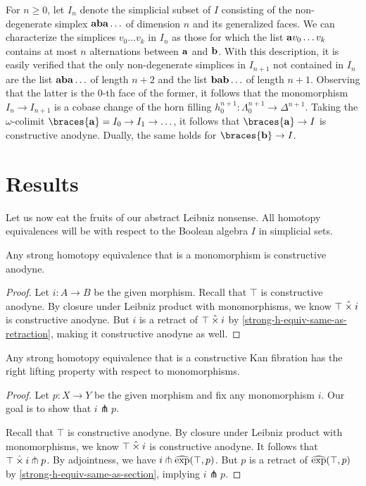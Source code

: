 \documentclass[reqno,10pt,a4paper,oneside]{amsart}
\begin{document}
For $n \geq 0$, let $I_n$ denote the simplicial subset of $I$ consisting of the non-degenerate simplex $\mathbf{a} \mathbf{b} \mathbf{a} \ldots$ of dimension $n$ and its generalized faces.
We can characterize the simplices $v_0 \ldots v_k$ in $I_n$ as those for which the list $\mathbf{a} v_0 \ldots v_k$ contains at most $n$ alternations between $\mathbf{a}$ and $\mathbf{b}$.
With this description, it is easily verified that the only non-degenerate simplices in $I_{n+1}$ not contained in $I_n$ are the list $\mathbf{a} \mathbf{b} \mathbf{a} \ldots$ of length $n+2$ and the list $\mathbf{b} \mathbf{a} \mathbf{b} \ldots$ of length $n+1$.
Observing that the latter is the $0$-th face of the former, it follows that the monomorphism $I_n \to I_{n+1}$ is a cobase change of the horn filling $h_{0}^{n+1} : \Lambda_0^{n+1} \to \Delta^{n+1}$.
Taking the $\omega$-colimit $\braces{\ptA} = I_0 \to I_1 \to \ldots$, it follows that $\braces{\ptA} \to I$ is constructive anodyne.
Dually, the same holds for $\braces{\ptB} \to I$.

\section{Results}

Let us now eat the fruits of our abstract Leibniz nonsense.
All homotopy equivalences will be with respect to the Boolean algebra $I$ in simplicial sets.

\begin{lemma}
\label{strong-h-equiv-mono-is-anodyne}
Any strong homotopy equivalence that is a monomorphism is constructive anodyne.
\end{lemma}

\begin{proof}
Let $i : A \to B$ be the given morphism.
Recall that $\top$ is constructive anodyne.
By closure under Leibniz product with monomorphisms, we know $\top \mathbin{\hat{\times}} i$ is constructive anodyne.
But $i$ is a retract of $\top \mathbin{\hat{\times}} i$ by \cref{strong-h-equiv-same-as-retraction}, making it constructive anodyne as well.
\end{proof}

\begin{lemma}
Any strong homotopy equivalence that is a constructive Kan fibration has the right lifting property with respect to monomorphisms.
\end{lemma}

\begin{proof}
Let $p : X \to Y$ be the given morphism and fix any monomorphism $i$.
Our goal is to show that $i \pitchfork p$.

Recall that $\top$ is constructive anodyne.
By closure under Leibniz product with monomorphisms, we know $\top \mathbin{\hat{\times}} i$ is constructive anodyne.
It follows that $\top \mathbin{\hat{\times}} i \pitchfork p$.
By adjointness, we have $i \pitchfork \operatorname{\widehat{exp}}(\top, p)$.
But $p$ is a retract of $\operatorname{\widehat{exp}}(\top, p)$ by \cref{strong-h-equiv-same-as-section}, implying $i \pitchfork p$.
\end{proof}
\end{document}
